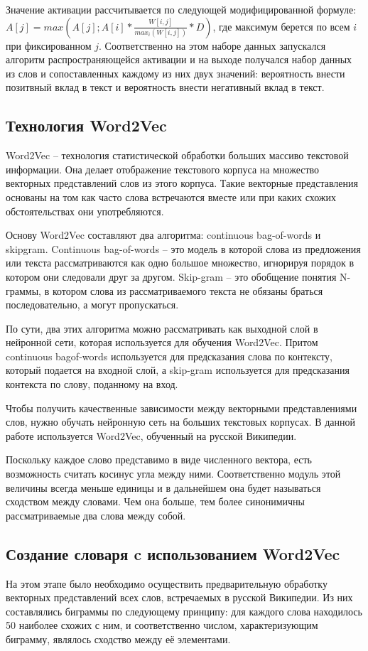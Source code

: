 Значение активации рассчитывается по следующей модифицированной формуле:
$A[j] = max(A[j]; A[i] * \frac{W[i,j]}{max_i(W[i,j])} * D)$, где максимум
берется по всем $i$ при фиксированном $j$. Соответственно на этом наборе данных
запускался алгоритм распространяющейся активации и на выходе получался набор
данных из слов и сопоставленных каждому из них двух значений: вероятность внести
позитвный вклад в текст и вероятность внести негативный вклад в текст.

\subsection{Технология Word2Vec}
Word2Vec -- технология статистической обработки больших массиво текстовой
информации. Она делает отображение текстового корпуса на множество векторных
представлений слов из этого корпуса. Такие векторные представления основаны
на том как часто слова встречаются вместе или при каких схожих обстоятельствах
они употребляются.

Основу Word2Vec составляют два алгоритма: continuous bag-of-words и skipgram.
Continuous bag-of-words -- это модель в которой слова из предложения или
текста рассматриваются как одно большое множество, игнорируя порядок в котором
они следовали друг за другом. Skip-gram -- это обобщение понятия N-граммы, в
котором слова из рассматриваемого текста не обязаны браться последовательно, а
могут пропускаться.

По сути, два этих алгоритма можно рассматривать как выходной слой в нейронной
сети, которая используется для обучения Word2Vec. Притом continuous bagof-words
используется для предсказания слова по контексту, который подается на
входной слой, а skip-gram используется для предсказания контекста по слову,
поданному на вход.

Чтобы получить качественные зависимости между векторными представлениями слов,
нужно обучать нейронную сеть на больших текстовых корпусах. В данной
работе используется Word2Vec, обученный на русской Википедии.

Поскольку каждое слово представимо в виде численного вектора, есть возможность
считать косинус угла между ними. Соответственно модуль этой величины всегда
меньше единицы и в дальнейшем она будет называться сходством между словами.
Чем она больше, тем более синонимичны рассматриваемые два слова между собой.

\subsection{Создание словаря c использованием Word2Vec}
На этом этапе было необходимо осуществить предварительную обработку векторных
представлений всех слов, встречаемых в русской Википедии. Из них составлялись
биграммы по следующему принципу: для каждого слова находилось 50 наиболее схожих
с ним, и соответственно числом, характеризующим биграмму, являлось
сходство между её элементами.

